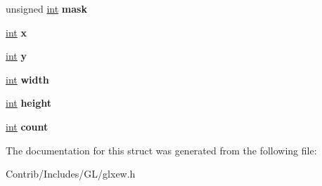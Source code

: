 \begin{DoxyCompactItemize}
\item 
unsigned \hyperlink{_s_d_l__thread_8h_a6a64f9be4433e4de6e2f2f548cf3c08e}{int} {\bfseries mask}\hypertarget{struct_g_l_x_buffer_clobber_event_s_g_i_x_a9329373e072de2722816d1c2934405db}{}\label{struct_g_l_x_buffer_clobber_event_s_g_i_x_a9329373e072de2722816d1c2934405db}

\item 
\hyperlink{_s_d_l__thread_8h_a6a64f9be4433e4de6e2f2f548cf3c08e}{int} {\bfseries x}\hypertarget{struct_g_l_x_buffer_clobber_event_s_g_i_x_a6150e0515f7202e2fb518f7206ed97dc}{}\label{struct_g_l_x_buffer_clobber_event_s_g_i_x_a6150e0515f7202e2fb518f7206ed97dc}

\item 
\hyperlink{_s_d_l__thread_8h_a6a64f9be4433e4de6e2f2f548cf3c08e}{int} {\bfseries y}\hypertarget{struct_g_l_x_buffer_clobber_event_s_g_i_x_a0a2f84ed7838f07779ae24c5a9086d33}{}\label{struct_g_l_x_buffer_clobber_event_s_g_i_x_a0a2f84ed7838f07779ae24c5a9086d33}

\item 
\hyperlink{_s_d_l__thread_8h_a6a64f9be4433e4de6e2f2f548cf3c08e}{int} {\bfseries width}\hypertarget{struct_g_l_x_buffer_clobber_event_s_g_i_x_a2474a5474cbff19523a51eb1de01cda4}{}\label{struct_g_l_x_buffer_clobber_event_s_g_i_x_a2474a5474cbff19523a51eb1de01cda4}

\item 
\hyperlink{_s_d_l__thread_8h_a6a64f9be4433e4de6e2f2f548cf3c08e}{int} {\bfseries height}\hypertarget{struct_g_l_x_buffer_clobber_event_s_g_i_x_ad12fc34ce789bce6c8a05d8a17138534}{}\label{struct_g_l_x_buffer_clobber_event_s_g_i_x_ad12fc34ce789bce6c8a05d8a17138534}

\item 
\hyperlink{_s_d_l__thread_8h_a6a64f9be4433e4de6e2f2f548cf3c08e}{int} {\bfseries count}\hypertarget{struct_g_l_x_buffer_clobber_event_s_g_i_x_ad43c3812e6d13e0518d9f8b8f463ffcf}{}\label{struct_g_l_x_buffer_clobber_event_s_g_i_x_ad43c3812e6d13e0518d9f8b8f463ffcf}

\end{DoxyCompactItemize}


The documentation for this struct was generated from the following file\+:\begin{DoxyCompactItemize}
\item 
Contrib/\+Includes/\+G\+L/glxew.\+h\end{DoxyCompactItemize}
